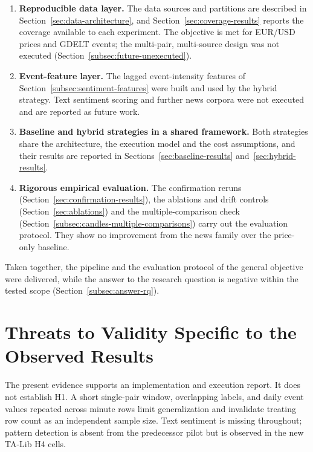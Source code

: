 \begin{enumerate}
    \item \textbf{Reproducible data layer.} The data sources and partitions are described in Section~\ref{sec:data-architecture}, and Section~\ref{sec:coverage-results} reports the coverage available to each experiment. The objective is met for EUR/USD prices and GDELT events; the multi-pair, multi-source design was not executed (Section~\ref{subsec:future-unexecuted}).
    \item \textbf{Event-feature layer.} The lagged event-intensity features of Section~\ref{subsec:sentiment-features} were built and used by the hybrid strategy. Text sentiment scoring and further news corpora were not executed and are reported as future work.
    \item \textbf{Baseline and hybrid strategies in a shared framework.} Both strategies share the architecture, the execution model and the cost assumptions, and their results are reported in Sections~\ref{sec:baseline-results} and~\ref{sec:hybrid-results}.
    \item \textbf{Rigorous empirical evaluation.} The confirmation reruns (Section~\ref{sec:confirmation-results}), the ablations and drift controls (Section~\ref{sec:ablations}) and the multiple-comparison check (Section~\ref{subsec:candles-multiple-comparisons}) carry out the evaluation protocol. They show no improvement from the news family over the price-only baseline.
\end{enumerate}

Taken together, the pipeline and the evaluation protocol of the general objective were delivered, while the answer to the research question is negative within the tested scope (Section~\ref{subsec:answer-rq}).

\section{Threats to Validity Specific to the Observed Results} \label{sec:experimental-threats}

The present evidence supports an implementation and execution report. It does not establish H1. A short single-pair window, overlapping labels, and daily event values repeated across minute rows limit generalization and invalidate treating row count as an independent sample size. Text sentiment is missing throughout; pattern detection is absent from the predecessor pilot but is observed in the new TA-Lib H4 cells.

